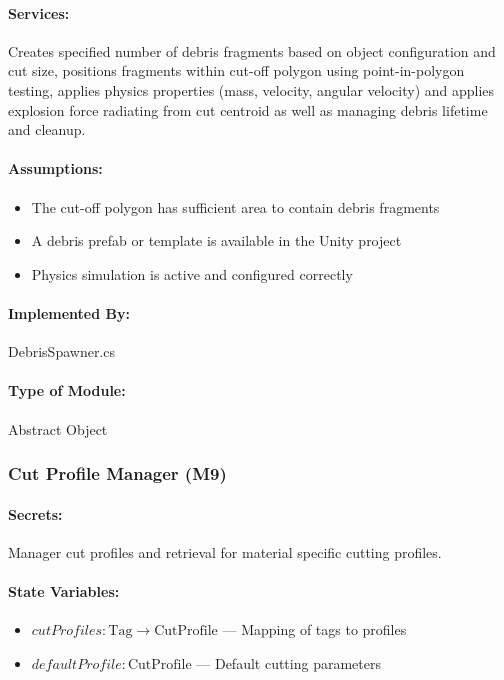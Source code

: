 \documentclass[12pt, titlepage]{article}
\begin{document}
\paragraph{Services:}
Creates specified number of debris fragments based on object configuration and cut size, positions fragments within cut-off polygon using point-in-polygon testing, applies physics properties (mass, velocity, angular velocity) and applies explosion force radiating from cut centroid as well as managing debris lifetime and cleanup.

\paragraph{Assumptions:}
\begin{itemize}
\item The cut-off polygon has sufficient area to contain debris fragments
\item A debris prefab or template is available in the Unity project
\item Physics simulation is active and configured correctly
\end{itemize}

\paragraph{Implemented By:}
DebrisSpawner.cs

\paragraph{Type of Module:}
Abstract Object

\vspace{10mm}

\subsubsection{Cut Profile Manager (M9)} \label{M9}

\paragraph{Secrets:}
Manager cut profiles and retrieval for material specific cutting profiles.

\paragraph{State Variables:}
\begin{itemize}
\item $cutProfiles : \text{Tag} \rightarrow \text{CutProfile}$ --- Mapping of tags to profiles
\item $defaultProfile : \text{CutProfile}$ --- Default cutting parameters
\end{itemize}
\end{document}
